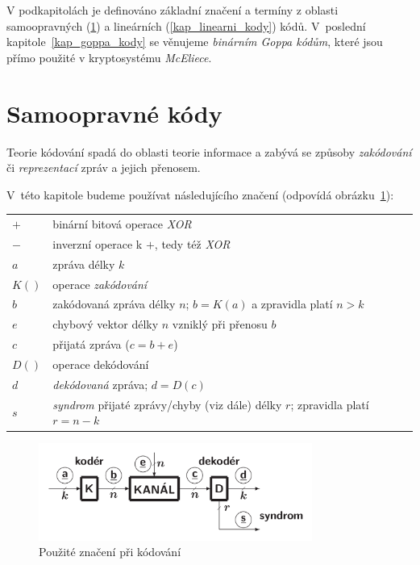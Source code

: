 \documentclass[thesis=M,czech,hidelinks]{FITthesis}[2012/06/26]
\newcommand{\0}{{\textcolor[gray]{0.80}{0}}}
\begin{document}
V podkapitolách je definováno základní značení a termíny z oblasti samoopravných
(\ref{kap_samoopravne_kody}) a lineárních (\ref{kap_linearni_kody}) kódů.
V~poslední kapitole~\ref{kap_goppa_kody} se věnujeme \emph{binárním Goppa
kódům}, které jsou přímo použité v kryptosystému \emph{McEliece}.

\section{Samoopravné kódy}\label{kap_samoopravne_kody}

Teorie kódování spadá do oblasti teorie informace a zabývá se způsoby
\emph{zakódování} či \emph{reprezentací} zpráv a jejich přenosem.

V~této kapitole budeme používat následujícího značení (odpovídá
obrázku~\ref{obr_kodovani}):

\begin{center}
\begin{tabular}{l p{10cm}}
    $+$     &   binární bitová operace \emph{XOR} \\
    $-$     &   inverzní operace k $+$, tedy též \emph{XOR} \\
    $a$     &   zpráva délky $k$ \\
    $K()$   &   operace \emph{zakódování} \\
    $b$     &   zakódovaná zpráva délky $n$; $b=K(a)$ a zpravidla platí $n>k$ \\
    $e$     &   chybový vektor délky $n$ vzniklý při přenosu $b$ \\
    $c$     &   přijatá zpráva ($c=b+e$) \\
    $D()$   &   operace dekódování \\
    $d$     &   \emph{dekódovaná} zpráva; $d=D(c)$ \\
    $s$     &   \emph{syndrom} přijaté zprávy/chyby (viz dále) délky $r$;
                zpravidla platí $r=n-k$ \\
\end{tabular}
\end{center}

\begin{figure}
    \centering
    \includegraphics[width=0.8\textwidth]{materialy/aak-kodovani.png}
    \caption{Použité značení při kódování~\cite{FIT_AAK}}
    \label{obr_kodovani}
\end{figure}
\end{document}
